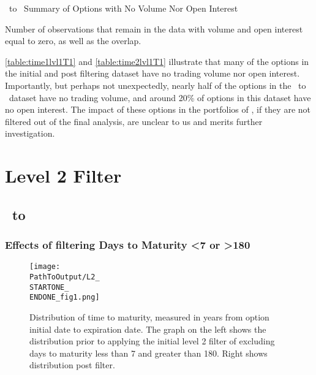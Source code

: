 \begin{appendix}
\begin{table}[ht]

\centering
{}
\caption{\STARTTWO\ to \ENDONE\ Summary of Options with No Volume Nor Open Interest}



\caption*{
  Number of observations that remain in the data with volume and open interest equal to zero, as well as the overlap. 
}
\label{table:time2lvl1T1}
\end{table}

\autoref{table:time1lvl1T1} and \autoref{table:time2lvl1T1} illustrate that many of the options in the initial and post filtering dataset have no trading volume nor open interest. Importantly, but perhaps not unexpectedly, nearly half of the options in the \STARTONE\ to \ENDONE\ dataset have no trading volume, and around 20\% of options in this dataset have no open interest. The impact of these options in the portfolios of \citet{constantinides2013}, if they are not filtered out of the final analysis, are unclear to us and merits further investigation. 

\newpage

\section{Level 2 Filter}\label{app:lvl2}
\subsection{\STARTONE\ to \ENDONE }

\subsubsection{Effects of filtering Days to Maturity <7 or >180}
\begin{figure}[H] %
  \centering
  \texttt{[image: \\PathToOutput/L2\_\\STARTONE\_\\ENDONE\_fig1.png]}%
  \caption{Distribution of time to maturity, measured in years from option initial date to expiration date. The graph on the left shows the distribution prior to applying the initial level 2 filter of excluding days to maturity less than 7 and greater than 180. Right shows distribution post filter.}
\label{fig:time1lvl2fig1}
\end{figure}


\end{appendix}
